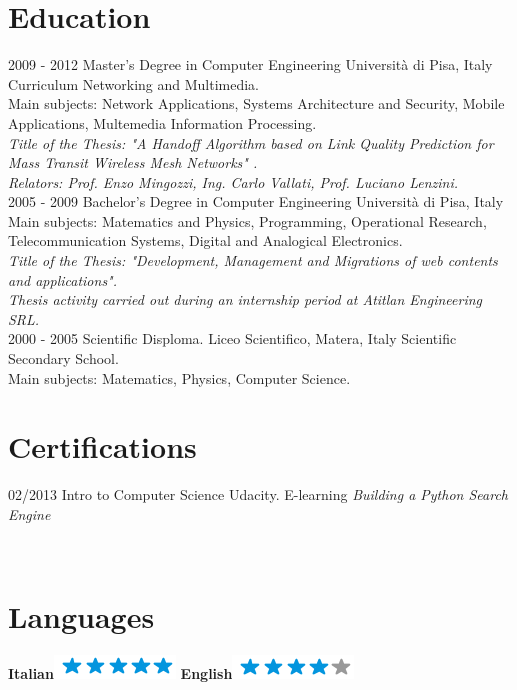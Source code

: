\documentclass[]{friggeri-cv}
\begin{document}
\section{Education}
\begin{entrylist}
  \entry
    {2009 - 2012}
    {Master's Degree in Computer Engineering}
    {Università di Pisa, Italy}
    {Curriculum Networking and Multimedia.\\
    Main subjects: Network Applications, Systems Architecture and Security, Mobile Applications, Multemedia Information            Processing.\\
    \emph{Title of the Thesis: "A Handoff Algorithm based on Link Quality Prediction for Mass Transit Wireless Mesh Networks"      .}\\
    \emph{Relators: Prof. Enzo Mingozzi, Ing. Carlo Vallati, Prof. Luciano Lenzini.}\\}
  \entry
    {2005 - 2009}
    {Bachelor's Degree in Computer Engineering}
    {Università di Pisa, Italy}
    {Main subjects: Matematics and Physics, Programming, Operational Research, Telecommunication Systems, Digital and Analogical Electronics.\\
    \emph{Title of the Thesis: "Development, Management and Migrations of web contents and applications".}\\
    \emph{Thesis activity carried out during an internship period at Atitlan Engineering SRL.}\\}
  \entry
    {2000 - 2005}
    {Scientific Disploma.}
    {Liceo Scientifico, Matera, Italy}
    {Scientific Secondary School.\\
    Main subjects: Matematics, Physics, Computer Science.}
\end{entrylist}

\section{Certifications}
\begin{entrylist}
  \entry
    {02/2013}
    {Intro to Computer Science}
    {Udacity. E-learning}
    {\emph{Building a Python Search Engine}}
\end{entrylist}

\newpage

\begin{aside}
~
~
~
~
  \section{Languages}
    \textbf{Italian}\includegraphics[scale=0.40]{img/5stars.png}
    \textbf{English}\includegraphics[scale=0.40]{img/4stars.png}
\end{aside}
\end{document}
